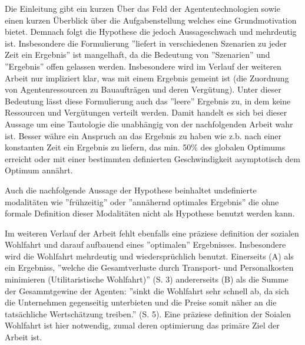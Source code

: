 \documentclass[sigconf]{acmart}
\theoremstyle{break}
\begin{document}
Die Einleitung gibt ein kurzen Über das Feld der Agententechnologien sowie einen kurzen Überblick über die Aufgabenstellung welches eine Grundmotivation bietet. Demnach folgt die Hypothese die jedoch Aussageschwach und mehrdeutig ist. Insbesondere die Formulierung ''liefert in verschiedenen Szenarien zu jeder Zeit ein Ergebnis''
ist mangelhaft, da die Bedeutung von ''Szenarien'' und ''Ergebnis'' offen gelassen werden. Insbesondere wird im Verlauf der weiteren Arbeit nur impliziert klar, was mit einem Ergebnis gemeint ist (die Zuordnung von Agentenressourcen zu Bauaufträgen und deren Vergütung). Unter dieser Bedeutung lässt diese Formulierung auch das ''leere'' Ergebnis zu,
in dem keine Ressourcen und Vergütungen verteilt werden. Damit handelt es sich bei dieser Aussage um eine Tautologie die unabhängig von der nachfolgenden Arbeit wahr ist.
Besser währe ein Anspruch an das Ergebnis zu haben wie z.b. nach einer konstanten Zeit ein Ergebnis zu liefern, das min. 50\% des globalen Optimums erreicht oder mit einer bestimmten definierten Geschwindigkeit asymptotisch dem Optimum annährt.

Auch die nachfolgende Aussage der Hypothese beinhaltet undefinierte modalitäten wie ''frühzeitig'' oder ''annähernd optimales Ergebnis'' die ohne formale Definition dieser Modalitäten nicht als Hypothese benutzt werden kann.


Im weiteren Verlauf der Arbeit fehlt ebenfalls eine präziese definition der sozialen Wohlfahrt und darauf aufbauend eines ''optimalen'' Ergebnisses. Insbesondere wird die Wohlfahrt mehrdeutig und wiedersprüchlich benutzt. Einerseits (A) als ein Ergebniss,
''welche die Gesamtverluste durch Transport- und Personalkosten minimieren (Utilitaristische Wohlfahrt)'' (S. 3)
andererseits (B) als die Summe der Gesammtgewine der Agenten: ''sinkt die Wohlfahrt sehr schnell ab, da sich die Unternehmen gegenseitig unterbieten und die Preise somit näher an die tatsächliche Wertschätzung treiben.'' (S. 5). Eine präziese definition der Soialen Wohlfahrt ist hier notwendig, zumal deren optimierung das primäre Ziel der Arbeit ist.
\end{document}
